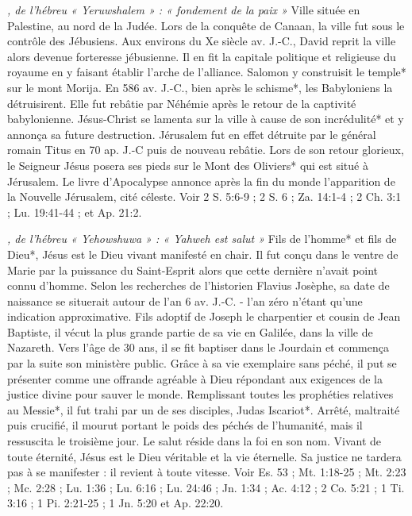 \begin{multicols}{2}
\textit{, de l'hébreu « Yeruwshalem » : « fondement de la paix »}\newline
Ville située en Palestine, au nord de la Judée. Lors de la conquête de Canaan, la ville fut sous le contrôle des Jébusiens. Aux environs du Xe siècle av. J.-C., David reprit la ville alors devenue forteresse jébusienne. Il en fit la capitale politique et religieuse du royaume en y faisant établir l'arche de l'alliance. Salomon y construisit le temple* sur le mont Morija. En 586 av. J.-C., bien après le schisme*, les Babyloniens la détruisirent. Elle fut rebâtie par Néhémie après le retour de la captivité babylonienne. Jésus-Christ se lamenta sur la ville à cause de son incrédulité* et y annonça sa future destruction. Jérusalem fut en effet détruite par le général romain Titus en 70 ap. J.-C puis de nouveau rebâtie. Lors de son retour glorieux, le Seigneur Jésus posera ses pieds sur le Mont des Oliviers* qui est situé à Jérusalem. Le livre d'Apocalypse annonce après la fin du monde l'apparition de la Nouvelle Jérusalem, cité céleste. Voir 2 S. 5:6-9 ; 2 S. 6 ; Za. 14:1-4 ; 2 Ch. 3:1 ; Lu. 19:41-44 ; et Ap. 21:2.

\textit{, de l'hébreu « Yehowshuwa » : « Yahweh est salut »}\newline
Fils de l'homme* et fils de Dieu*, Jésus est le Dieu vivant manifesté en chair. Il fut conçu dans le ventre de Marie par la puissance du Saint-Esprit alors que cette dernière n'avait point connu d'homme. Selon les recherches de l'historien Flavius Josèphe, sa date de naissance se situerait autour de l'an 6 av. J.-C. - l'an zéro n'étant qu'une indication approximative. Fils adoptif de Joseph le charpentier et cousin de Jean Baptiste, il vécut la plus grande partie de sa vie en Galilée, dans la ville de Nazareth. Vers l'âge de 30 ans, il se fit baptiser dans le Jourdain et commença par la suite son ministère public. Grâce à sa vie exemplaire sans péché, il put se présenter comme une offrande agréable à Dieu répondant aux exigences de la justice divine pour sauver le monde. Remplissant toutes les prophéties relatives au Messie*, il fut trahi par un de ses disciples, Judas Iscariot*. Arrêté, maltraité puis crucifié, il mourut portant le poids des péchés de l'humanité, mais il ressuscita le troisième jour. Le salut réside dans la foi en son nom. Vivant de toute éternité, Jésus est le Dieu véritable et la vie éternelle. Sa justice ne tardera pas à se manifester : il revient à toute vitesse. Voir Es. 53 ; Mt. 1:18-25 ; Mt. 2:23 ; Mc. 2:28 ; Lu. 1:36 ; Lu. 6:16 ; Lu. 24:46 ; Jn. 1:34 ; Ac. 4:12 ; 2 Co. 5:21 ; 1 Ti. 3:16 ; 1 Pi. 2:21-25 ; 1 Jn. 5:20 et Ap. 22:20.


\end{multicols}
